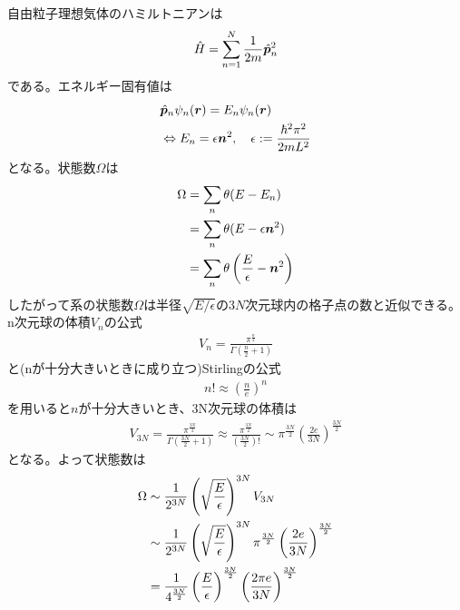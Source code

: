 \documentclass[dvipdfmx, 11pt, a4paper]{jsarticle}
\theoremstyle{definition}
\begin{document}
    \begin{derivationBox}
        自由粒子理想気体のハミルトニアンは
        \begin{align}
            \hat{H} = \sum_{n=1}^N \frac{1}{2m} \hat{\bm{p}}_n^2 \notag
        \end{align}
        である。エネルギー固有値は
        \begin{align}
            &\hat{\bm{p}}_n \psi_n(\bm{r}) = E_n \psi_n(\bm{r}) \notag \\
            &\Leftrightarrow E_n = \epsilon \bm{n}^2,\quad \epsilon := \frac{\hbar^2 \pi^2}{2mL^2} \notag 
        \end{align}
        となる。状態数$\Omega$は
        \begin{align}
            \Omega &= \sum_n \theta(E - E_n) \notag \\
            &= \sum_n \theta (E - \epsilon \bm{n}^2) \notag \\
            &= \sum_n \theta \left( \frac{E}{\epsilon} - \bm{n}^2 \right) \notag 
        \end{align}
        したがって系の状態数$\Omega$は半径$\sqrt{E/\epsilon}$の$3N$次元球内の格子点の数と近似できる。n次元球の体積$V_n$の公式
        \begin{align}
            V_n = \frac{\pi^{\frac{n}{2}}}{\Gamma\left(\frac{n}{2}+1\right)} 
        \end{align}
        と(nが十分大きいときに成り立つ)Stirlingの公式
        \begin{align}
            n! \approx \left( \frac{n}{e} \right)^n
        \end{align}
        を用いると$n$が十分大きいとき、3N次元球の体積は
        \begin{align}
            V_{3N} = \frac{\pi^{\frac{3N}{2}}}{\Gamma\left(\frac{3N}{2}+1\right)} \approx \frac{\pi^{\frac{3N}{2}}}{\left(\frac{3N}{2}\right)!} \sim \pi^{\frac{3N}{2}} \left( \frac{2e}{3N} \right)^{\frac{3N}{2}}
        \end{align}
        となる。よって状態数は
        \begin{align}
            \Omega &\sim \frac{1}{2^{3N}} \left( \sqrt{\frac{E}{\epsilon}} \right)^{3N} V_{3N}\notag \\
            &\sim \frac{1}{2^{3N}} \left( \sqrt{\frac{E}{\epsilon}} \right)^{3N} \pi^{\frac{3N}{2}} \left( \frac{2e}{3N} \right)^{\frac{3N}{2}}\notag \\
            &= \frac{1}{4^{\frac{3N}{2}}} \left( \frac{E}{\epsilon} \right)^{\frac{3N}{2}}  \left( \frac{2\pi e}{3N} \right)^{\frac{3N}{2}} \notag \\

\end{align}
\end{derivationBox}
\end{document}
